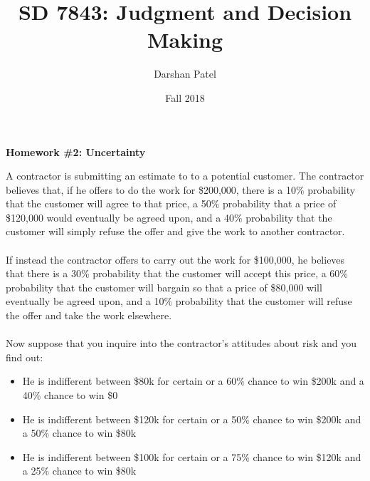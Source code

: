 \documentclass[12pt]{article}
\begin{document}
\theoremstyle{definition}
\newtheorem{theorem}{Theorem}[section]
\newtheorem{definition}{Definition}[section]
\newtheorem{example}{Example}[section]

\title{SD 7843: Judgment and Decision Making}
\author{Darshan Patel}
\date{Fall 2018}
\begin{center} \textbf{Homework \#2: Uncertainty} \end{center}

A contractor is submitting an estimate to to a potential customer. The contractor believes that, if he offers to do the work for \$200,000, there is a 10\% probability that the customer will agree to that price, a 50\% probability that a price of \$120,000 would eventually be agreed upon, and a 40\% probability that the customer will simply refuse the offer and give the work to another contractor. \\~\\
If instead the contractor offers to carry out the work for \$100,000, he believes that there is a 30\% probability that the customer will accept this price, a 60\% probability that the customer will bargain so that a price of \$80,000 will eventually be agreed upon, and a 10\% probability that the customer will refuse the offer and take the work elsewhere. \\~\\
Now suppose that you inquire into the contractor's attitudes about risk and you find out: \begin{itemize}
\item He is indifferent between \$80k for certain or a 60\% chance to win \$200k and a 40\% chance to win \$0
\item He is indifferent between \$120k for certain or a 50\% chance to win \$200k and a 50\% chance to win \$80k
\item He is indifferent between \$100k for certain or a 75\% chance to win \$120k and a 25\% chance to win \$80k 
\end{itemize}
\end{document}

